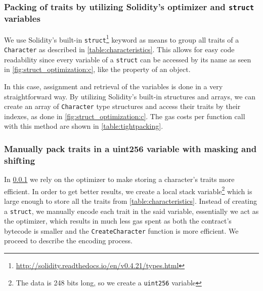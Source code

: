 \subsubsection{Packing of traits by utilizing Solidity's optimizer and \texttt{struct} variables} \label{method1}
We use Solidity's built-in \texttt{struct}\footnote{\url{http://solidity.readthedocs.io/en/v0.4.21/types.html}} keyword as means to group all traits of a \texttt{Character} as described in \ref{table:characteristics}. This allows for easy code readability since every variable of a \texttt{struct} can be accessed by its name as seen in \ref{fig:struct_optimization:c}, like the property of an object. 



In this case, assignment and retrieval of the variables is done in a very straightforward way. By utilizing Solidity's built-in structures and arrays, we can create an array of \texttt{Character} type structures and access their traits by their indexes, as done in \ref{fig:struct_optimization:c}. The gas costs per function call with this method are shown in \ref{table:tightpacking}.



\subsubsection{Manually pack traits in a uint256 variable with masking and shifting} \label{method2}
    
In \ref{method1} we rely on the optimizer to make storing a character's traits more efficient. In order to get better results, we create a local stack variable\footnote{The data is 248 bits long, so we create a \texttt{uint256} variable} which is large enough to store all the traits from \ref{table:characteristics}. Instead of creating a \texttt{struct}, we manually encode each trait in the said variable, essentially we act as the optimizer, which results in much less gas spent as both the contract's bytecode is smaller and the \texttt{CreateCharacter} function is more efficient. We proceed to describe the encoding process.




